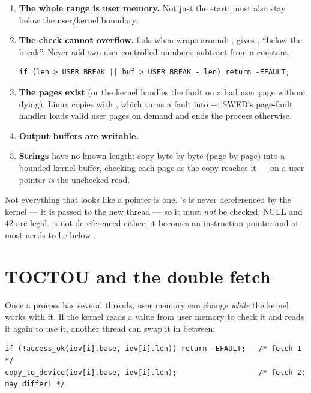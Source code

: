 \begin{enumerate}
  \item \textbf{The whole range is user memory.} Not just the start:
     must also stay below the user/kernel boundary.
  \item \textbf{The check cannot overflow.} 
    fails when  wraps around: ,
     gives , ``below the
    break''. Never add two user-controlled numbers; subtract from a
    constant:
\begin{lstlisting}
if (len > USER_BREAK || buf > USER_BREAK - len) return -EFAULT;
\end{lstlisting}
  \item \textbf{The pages exist} (or the kernel handles the fault on a bad
    user page without dying). Linux copies with ,
    which turns a fault into $-$; SWEB's page-fault handler
    loads valid user pages on demand and ends the process otherwise.
  \item \textbf{Output buffers are writable.}
  \item \textbf{Strings} have no known length: copy byte by byte (page by
    page) into a bounded kernel buffer, checking each page as the copy
    reaches it ---  on a user pointer \emph{is} the unchecked
    read.
\end{enumerate}

Not everything that looks like a pointer is one. 's
 is never dereferenced by the kernel --- it is passed to the new
thread --- so it must \emph{not} be checked; NULL and 42 are legal.
 is not dereferenced either; it becomes an
instruction pointer and at most needs to lie below .

\section{TOCTOU and the double fetch}

Once a process has several threads, user memory can change \emph{while}
the kernel works with it. If the kernel reads a value from user memory to
check it and reads it again to use it, another thread can swap it in
between:

\begin{lstlisting}
if (!access_ok(iov[i].base, iov[i].len)) return -EFAULT;   /* fetch 1 */
copy_to_device(iov[i].base, iov[i].len);                   /* fetch 2: may differ! */
\end{lstlisting}

